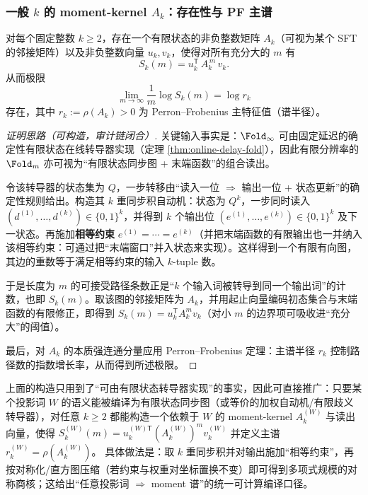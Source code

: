 \subsubsection{一般 \texorpdfstring{$k$}{k} 的 moment-kernel \texorpdfstring{$A_k$}{Ak}：存在性与 PF 主谱}\label{subsec:pom-ak-existence}
\begin{theorem}\label{thm:pom-collision-kernel-ak}
对每个固定整数 $k\ge 2$，存在一个有限状态的非负整数矩阵 $A_k$（可视为某个 SFT 的邻接矩阵）以及非负整数向量 $u_k,v_k$，使得对所有充分大的 $m$ 有
\[
S_k(m)=u_k^{\mathsf T}\,A_k^{\,m}\,v_k.
\]
从而极限
\[
\lim_{m\to\infty}\frac{1}{m}\log S_k(m)=\log r_k
\]
存在，其中 $r_k:=\rho(A_k)>0$ 为 Perron--Frobenius 主特征值（谱半径）。
\end{theorem}
\begin{proof}[证明思路（可构造，审计链闭合）]
关键输入事实是：$\Fold_\infty$ 可由固定延迟的确定性有限状态在线转导器实现（定理 \ref{thm:online-delay-fold}），因此有限分辨率的 $\Fold_m$ 亦可视为“有限状态同步图 + 末端函数”的组合读出。

令该转导器的状态集为 $Q$，一步转移由“读入一位 $\Rightarrow$ 输出一位 + 状态更新”的确定性规则给出。构造其 $k$ 重同步积自动机：状态为 $Q^k$，一步同时读入 $(d^{(1)},\dots,d^{(k)})\in\{0,1\}^k$，并得到 $k$ 个输出位 $(e^{(1)},\dots,e^{(k)})\in\{0,1\}^k$ 及下一状态。再施加\textbf{相等约束} $e^{(1)}=\cdots=e^{(k)}$（并把末端函数的有限输出也一并纳入该相等约束：可通过把“末端窗口”并入状态来实现）。这样得到一个有限有向图，其边的重数等于满足相等约束的输入 $k$-tuple 数。

于是长度为 $m$ 的可接受路径条数正是“$k$ 个输入词被转导到同一个输出词”的计数，也即 $S_k(m)$。取该图的邻接矩阵为 $A_k$，并用起止向量编码初态集合与末端函数的有限修正，即得到 $S_k(m)=u_k^{\mathsf T}A_k^{m}v_k$（对小 $m$ 的边界项可吸收进“充分大”的阈值）。

最后，对 $A_k$ 的本质强连通分量应用 Perron--Frobenius 定理：主谱半径 $r_k$ 控制路径数的指数增长率，从而得到所述极限。
\end{proof}

\begin{remark}\label{rem:pom-moment-compiler-general-word}
上面的构造只用到了“可由有限状态转导器实现”的事实，因此可直接推广：只要某个投影词 \(W\) 的语义能被编译为有限状态同步图（或等价的加权自动机/有限歧义转导器），对任意 \(k\ge 2\) 都能构造一个依赖于 \(W\) 的 moment-kernel
\(
A_k^{(W)}
\)
与读出向量，使得
\(
S_k^{(W)}(m)=u_k^{(W)\mathsf T}(A_k^{(W)})^{m}v_k^{(W)}
\)
并定义主谱 \(r_k^{(W)}=\rho(A_k^{(W)})\)。
具体做法是：取 \(k\) 重同步积并对输出施加“相等约束”，再按对称化/直方图压缩（若约束与权重对坐标置换不变）即可得到多项式规模的对称商核；这给出“任意投影词 \(\Rightarrow\) moment 谱”的统一可计算编译口径。
\end{remark}

